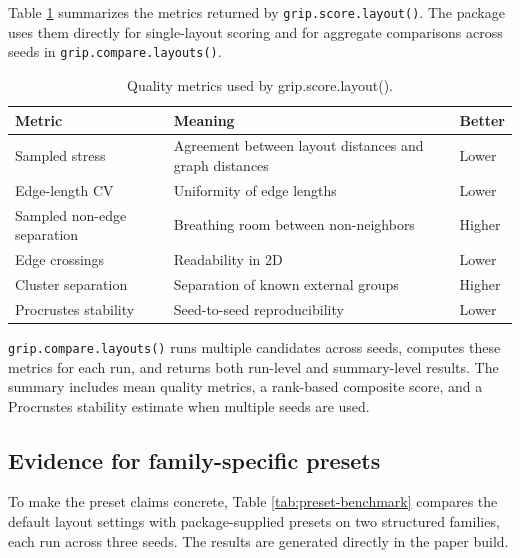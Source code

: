 Table \ref{tab:metrics-table} summarizes the metrics returned by
\texttt{grip.score.layout()}. The package uses them directly for single-layout scoring
and for aggregate comparisons across seeds in \texttt{grip.compare.layouts()}.

\begin{table}

\caption{\label{tab:metrics-table}Quality metrics used by grip.score.layout().}
\centering
\begin{tabular}[t]{l|l|l}
\hline
Metric & Meaning & Better\\
\hline
Sampled stress & Agreement between layout distances and graph distances & Lower\\
\hline
Edge-length CV & Uniformity of edge lengths & Lower\\
\hline
Sampled non-edge separation & Breathing room between non-neighbors & Higher\\
\hline
Edge crossings & Readability in 2D & Lower\\
\hline
Cluster separation & Separation of known external groups & Higher\\
\hline
Procrustes stability & Seed-to-seed reproducibility & Lower\\
\hline
\end{tabular}
\end{table}

\texttt{grip.compare.layouts()} runs multiple candidates across seeds, computes these
metrics for each run, and returns both run-level and summary-level results. The
summary includes mean quality metrics, a rank-based composite score, and a
Procrustes stability estimate when multiple seeds are used.

\subsection{Evidence for family-specific presets}\label{evidence-for-family-specific-presets}

To make the preset claims concrete, Table \ref{tab:preset-benchmark} compares
the default layout settings with package-supplied presets on two structured
families, each run across three seeds. The results are generated directly in
the paper build.

